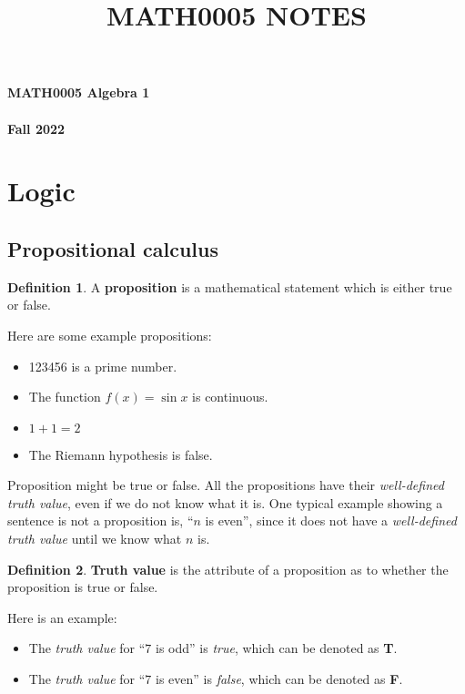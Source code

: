 \documentclass[11pt]{article}
\theoremstyle{definition}
\newtheorem{defn}{Definition}[subsection]
\begin{document}
\setcounter{section}{0}
\title{MATH0005 NOTES}

\thispagestyle{empty}

\begin{center}
{\LARGE \bf MATH0005 Algebra 1}\\
\quad\\
{\Large \bf Fall 2022}
\end{center}
\tableofcontents
\newpage

\section{Logic}
\subsection{Propositional calculus}
\begin{shaded}
\begin{defn}
    A \textbf{proposition} is a mathematical statement which is either true or false.
\end{defn}
\end{shaded}
Here are some example propositions:
    \begin{itemize}
        \item 123456 is a prime number.
        \item The function $f(x)= \sin x$ is continuous.
        \item $1+1=2$
        \item The Riemann hypothesis is false.
    \end{itemize}
Proposition might be true or false. All the propositions have their \textit{well-defined truth value}, even if we do not know what it is. One typical example showing a sentence is not a proposition is, ``$n$ is even'', since it does not have a \textit{well-defined truth value} until we know what $n$ is.

\begin{shaded}
\begin{defn}
\textbf{Truth value} is the attribute of a proposition as to whether the proposition is true or false.
\end{defn}
\end{shaded}

Here is an example:
\begin{itemize}
    \item The \textit{truth value} for ``$7$ is odd'' is \textit{true}, which can be denoted as \textbf{T}.
    \item The \textit{truth value} for ``$7$ is even'' is \textit{false}, which can be denoted as \textbf{F}.
\end{itemize}
\end{document}
